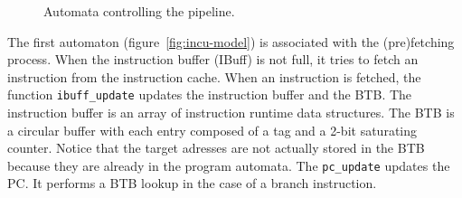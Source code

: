     \begin{figure}
      \centering
      \qquad\qquad
      \caption{Automata controlling the pipeline.}
    \end{figure}

    The first automaton (figure~\ref{fig:incu-model}) is associated with the (pre)fetching process.
    When the instruction buffer (IBuff) is not full, it tries to fetch an instruction from the instruction cache.
    When an instruction is fetched, the function \texttt{ibuff\_update} updates the instruction buffer and the BTB.
    The instruction buffer is an array of instruction runtime data structures.
    The BTB is a circular buffer with each entry composed of a tag and a 2-bit saturating counter.
    Notice that the target adresses are not actually stored in the BTB because they are already in the program automata.
    The \texttt{pc\_update} updates the PC.
    It performs a BTB lookup in the case of a branch instruction. 
    
